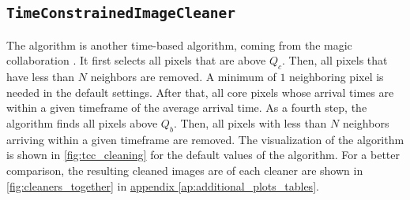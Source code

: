 \subsection*{\texttt{TimeConstrainedImageCleaner}}
\vspace{-0.5cm}
The \tcc{} algorithm is another time-based algorithm, coming from the \gls{magic} collaboration \cite{tcc}.
It first selects all pixels that are above \(Q_c\). Then, all pixels that have
less than \(N\) neighbors are removed. A minimum of \(\num{1}\) neighboring pixel is needed in the default
settings. After that, all core pixels whose arrival times are within a given timeframe of the average arrival time.
As a fourth step, the \tcc{} algorithm finds all pixels above \(Q_b\). Then, all pixels with
less than \(N\) neighbors arriving within a given timeframe are removed.
The visualization of the algorithm is shown in \autoref{fig:tcc_cleaning} for the default values of the algorithm.
For a better comparison, the resulting cleaned images are of each cleaner are shown in \autoref{fig:cleaners_together}
in \hyperref[ap:additional_plots_tables]{appendix \ref{ap:additional_plots_tables}}.
